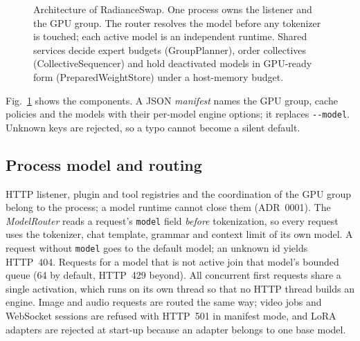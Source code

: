 \documentclass[10pt,conference,a4paper]{IEEEtran}
\newcommand{\code}[1]{\texttt{#1}}
\begin{document}
\begin{figure}[t]
{}
\caption{Architecture of RadianceSwap. One process owns the listener and the GPU group. The router
resolves the model before any tokenizer is touched; each active model is an independent runtime.
Shared services decide expert budgets (GroupPlanner), order collectives (CollectiveSequencer) and
hold deactivated models in GPU-ready form (PreparedWeightStore) under a host-memory budget.}
\label{fig:arch}
\end{figure}

Fig.~\ref{fig:arch} shows the components. A JSON \emph{manifest} names the GPU group, cache
policies and the models with their per-model engine options; it replaces \code{-{}-model}. Unknown
keys are rejected, so a typo cannot become a silent default.

\subsection{Process model and routing}

HTTP listener, plugin and tool registries and the coordination of the GPU group belong to the
process; a model runtime cannot close them (ADR~0001). The \emph{ModelRouter} reads a request's
\code{model} field \emph{before} tokenization, so every request uses the tokenizer, chat template,
grammar and context limit of its own model. A request without \code{model} goes to the default
model; an unknown id yields HTTP~404. Requests for a model that is not active join that model's
bounded queue (64 by default, HTTP~429 beyond). All concurrent first requests share a single
activation, which runs on its own thread so that no HTTP thread builds an engine. Image and audio
requests are routed the same way; video jobs and WebSocket sessions are refused with HTTP~501 in
manifest mode, and LoRA adapters are rejected at start-up because an adapter belongs to one base
model.
\end{document}
